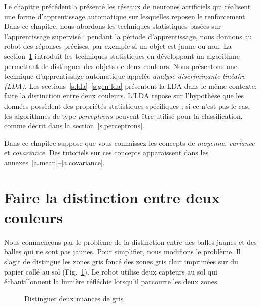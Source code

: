 Le chapitre précédent a présenté les réseaux de neurones artificiels qui réalisent une forme d'apprentissage automatique sur lesquelles reposen le renforcement. Dans ce chapitre, nous abordons les techniques statistiques basées sur l'apprentissage supervisé : pendant la période d'apprentissage, nous donnons au robot des réponses précises, par exemple si un objet est jaune ou non. La section~\ref{s.sorting-onesensor} introduit les techniques statistiques en développant un algorithme permettant de distinguer des objets de deux couleurs. Nous présentons une technique d'apprentissage automatique appelée \emph{analyse discriminante linéaire (LDA)}. Les sections~\ref{s.lda}--\ref{s.gen-lda} présentent la LDA dans le même contexte: faire la distinction entre deux couleurs. L'LDA repose sur l'hypothèse que les données possèdent des propriétés statistiques spécifiques ; si ce n'est pas le cas, les algorithmes de type \emph{perceptrons} peuvent être utilisé pour la classification, comme décrit dans la section~\ref{s.perceptrons}.

Dans ce chapitre suppose que vous connaissez les concepts de \emph{moyenne}, \emph{variance} et \emph{covariance}. Des tutoriels sur ces concepts apparaissent dans les annexes~\ref{a.mean}--\ref{a.covariance}.

\section{Faire la distinction entre deux couleurs}\label{s.sorting-onesensor}

Nous commençons par le problème de la distinction entre des balles jaunes et des balles qui ne sont pas jaunes. Pour simplifier, nous modifions le problème. Il s’agit de distingue les zones gris foncé des zones gris clair imprimées sur du papier collé au sol (Fig.~\ref{fig.closegrays1}). Le robot utilise deux capteurs au sol qui échantillonnent la lumière réfléchie lorsqu'il parcourte les deux zones.

\begin{figure}
\begin{center}
\caption{Distinguer deux nuances de gris}\label{fig.closegrays1}
\end{center}
\end{figure}

